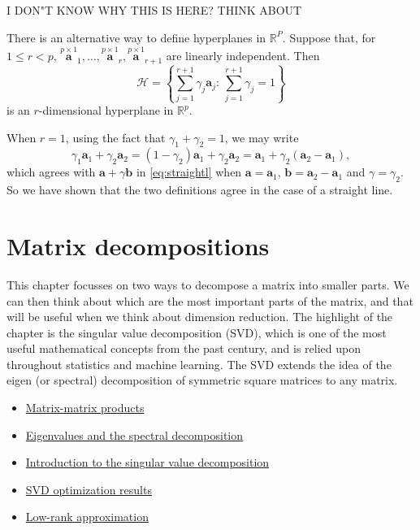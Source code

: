 \documentclass[]{book}
\providecommand{\tightlist}{%
  \setlength{\itemsep}{0pt}\setlength{\parskip}{0pt}}
\theoremstyle{definition}
\theoremstyle{definition}
\theoremstyle{definition}
\theoremstyle{remark}
\begin{document}
I DON"T KNOW WHY THIS IS HERE? THINK ABOUT

There is an alternative way to define hyperplanes in \(\mathbb{R}^P\). Suppose that, for \(1 \leq r <p\), \(\stackrel{p \times 1}{\boldsymbol a}_1, \ldots , \stackrel{p \times 1}{\boldsymbol a}_r, \stackrel{p \times 1}{\boldsymbol a}_{r+1}\) are linearly independent. Then
\[
\mathcal{H}=\left \{ \sum_{j=1}^{r+1} \gamma_j \boldsymbol a_j: \, \sum_{j=1}^{r+1}\gamma_j =1  \right \}
\]
is an \(r\)-dimensional hyperplane in \(\mathbb{R}^p\).

When \(r=1\), using the fact that \(\gamma_1+\gamma_2=1\), we may write
\[
\gamma_1 \boldsymbol a_1 + \gamma_2 \boldsymbol a_2=(1-\gamma_2)\boldsymbol a_1 + \gamma_2 \boldsymbol a_2 = \boldsymbol a_1 +\gamma_2(\boldsymbol a_2-\boldsymbol a_1),
\]
which agrees with \(\boldsymbol a+\gamma \boldsymbol b\) in \eqref{eq:straightl} when \(\boldsymbol a= \boldsymbol a_1\), \(\boldsymbol b= \boldsymbol a_2 -\boldsymbol a_1\) and \(\gamma=\gamma_2\). So we have shown that the two definitions agree in the case of a straight line.

\hypertarget{linalg-decomp}{%
\chapter{Matrix decompositions}\label{linalg-decomp}}

This chapter focusses on two ways to decompose a matrix into smaller parts. We can then think about which are the most important parts of the matrix, and that will be useful when we think about dimension reduction. The highlight of the chapter is the singular value decomposition (SVD), which is one of the most useful mathematical concepts from the past century, and is relied upon throughout statistics and machine learning. The SVD extends the idea of the eigen (or spectral) decomposition of symmetric square matrices to any matrix.

\begin{itemize}
\tightlist
\item
  \href{https://mediaspace.nottingham.ac.uk/media/Matrix-matrix+products/1_kelw2beu}{Matrix-matrix products}
\item
  \href{https://mediaspace.nottingham.ac.uk/media/Eigenvalues+and+the+spectral+decomposition/1_drbz1eg8}{Eigenvalues and the spectral decomposition}
\item
  \href{https://mediaspace.nottingham.ac.uk/media/Singular+value+decompositionA+introduction/1_okyjnqic}{Introduction to the singular value decomposition}
\item
  \href{https://mediaspace.nottingham.ac.uk/media/Singular+value+decompositionA+optimization+results/1_9jv8zfw0}{SVD optimization results}
\item
  \href{https://mediaspace.nottingham.ac.uk/media/Singular+value+decompositionA+low+rank+approximation/1_vwbtjdzo}{Low-rank approximation}
\end{itemize}
\end{document}
